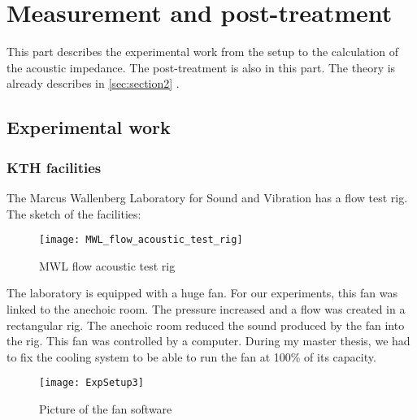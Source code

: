 \section{Measurement and post-treatment}
This part describes the experimental work from the setup to the calculation of the acoustic impedance. The post-treatment is also in this part. The theory is already describes in \ref{sec:section2} .
\subsection{Experimental work}
\subsubsection{KTH facilities}
The Marcus Wallenberg Laboratory for Sound and Vibration has a flow test rig. The sketch of the facilities:
\begin{figure}[H] \centering
    \texttt{[image: MWL\_flow\_acoustic\_test\_rig]}
    \caption{MWL flow acoustic test rig}
\end{figure}
The laboratory is equipped with a huge fan. For our experiments, this fan was linked to the anechoic room. The pressure increased and a flow was created in a rectangular rig. The anechoic room reduced the sound produced by the fan into the rig. This fan was controlled by a computer. During my master thesis, we had to fix the cooling system to be able to run the fan at 100\% of its capacity. 
\begin{figure}[H] \centering
    \texttt{[image: ExpSetup3]}
    \caption{Picture of the fan software}
\end{figure}\clearpage

